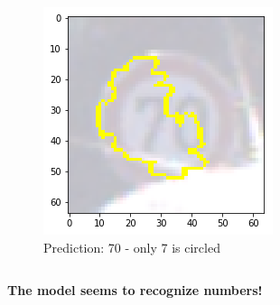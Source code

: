 \begin{frame}
\begin{columns}
\begin{column}{0.33\textwidth}
\begin{center}
\begin{figure}
					\includegraphics[width=0.9\linewidth]{Images/70Prediction}
					\caption[70]{Prediction: 70 - only 7 is circled}
					\label{fig:70Pred}
				\end{figure}
			\end{center}
		\end{column}
	\end{columns}
	\begin{center}	
		\textbf{The model seems to recognize numbers!}
	\end{center}
\end{frame}

